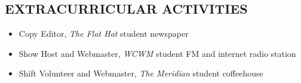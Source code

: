 \documentclass{res}     %
\begin{document}
\begin{resume}
\section{EXTRACURRICULAR ACTIVITIES}          
\vspace{5mm}
\begin{itemize}[leftmargin=5mm]
    \item Copy Editor, \emph{The Flat Hat} student newspaper
    \item Show Host and Webmaster, \emph{WCWM} student FM and internet radio station
    \item Shift Volunteer and Webmaster, \emph{The Meridian} student coffeehouse
\end{itemize}
 
\end{resume}
\end{document}
